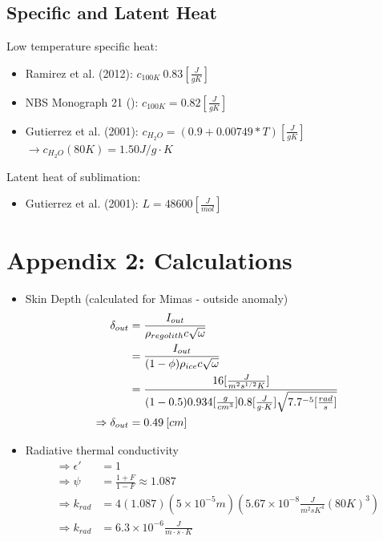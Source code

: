 \documentclass[11pt]{article} %
\begin{document}
\begin{itemize}
\subsection{Specific  and Latent Heat}
\label{sec:sheat}

	Low temperature specific heat:
	
	\begin{itemize}
	\item Ramirez et al. (2012): $c_{100 K} ~ 0.83 [\frac{J}{g K}]$
	\item NBS Monograph 21 (): $c_{100 K} = 0.82 [\frac{J}{g K}]$
	\item Gutierrez et al. (2001): $c_{H_{2}O} = (0.9 + 0.00749 * T) [\frac{J}{g K}]$
		$\rightarrow c_{H_{2}O}(80K) = 1.50 J/g\cdot K$
	\end{itemize}
	
	Latent heat of sublimation:
	
	\begin{itemize}
	\item Gutierrez et al. (2001): $L = 48600 [\frac{J}{mol}]$
	\end{itemize}

\section{Appendix 2: Calculations}

\begin{itemize} 
\item Skin Depth (calculated for Mimas - outside anomaly)
\begin{equation}
\begin{split}
\delta_{out} &= \frac{I_{out}}{\rho_{regolith} c \sqrt{\omega}}  \\
&= \frac{I_{out}}{(1-\phi)\rho_ {ice} c \sqrt{\omega}} \\
&= \frac{16[\frac{J}{m^{2} s^{1/2} K}]}{(1-0.5)0.934[\frac{g}{cm^{3}}]0.8[\frac{J}{g \cdot K}]\sqrt{7.7\time10^{-5}[\frac{rad}{s}]}} \\
\Rightarrow \delta_{out}&= 0.49\: [cm]
\end{split}
\end{equation}

\item Radiative thermal conductivity
	\begin{equation}
	\begin{split}
	\Rightarrow \epsilon' &= 1 \\
	\Rightarrow \psi &= \frac{1+F}{1-F} \approx 1.087 \\
	\Rightarrow k_{rad} &= 4 (1.087)(5\times10^{-5} m)(5.67\times10^{-8} \frac{J}{m^{2} s K^{4}}(80 K)^{3}) \\
	\Rightarrow k_{rad} &= 6.3\times10^{-6} \frac{J}{m \cdot s \cdot K}
	\end{split}
	\end{equation}


\end{itemize}
\end{itemize}
\end{document}
